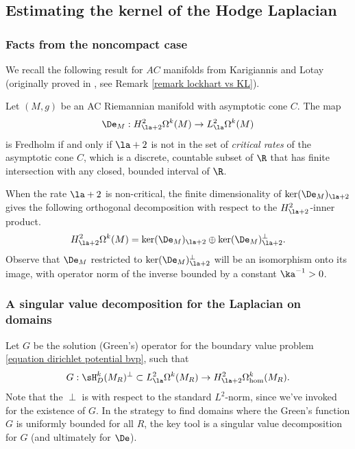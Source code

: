 \documentclass[hidelinks, 12pt, oneside, reqno]{amsart}
\begin{document}
\subsection{Estimating the kernel of the Hodge Laplacian}

\subsubsection{Facts from the noncompact case}

We recall the following result for $AC$ manifolds from Karigiannis and Lotay (originally proved in \cite{Lockhart1987}, see Remark \ref{remark lockhart vs KL}). 

\begin{thm}\cite[Theorem 4.11]{KarigiannisLotay}\label{theorem fredholmness of laplacian} Let $(M,g)$ be an AC Riemannian manifold with asymptotic cone $C$. The map
\[
\De_M: H^{2}_{\la + 2}\Omega^k(M) \rightarrow L^{2}_{\la}\Omega^k(M)
\]
is Fredholm if and only if $\la +2$ is not in the set of \emph{critical rates} of the asymptotic cone $C$, which is a discrete, countable subset of $\R$ that has finite intersection with any closed, bounded interval of $\R$.
\end{thm}

When the rate $\la + 2$ is non-critical, the finite dimensionality of $\ker(\De_M)_{\la +2}$ gives the following orthogonal decomposition with respect to the $H^{2}_{\la + 2}$-inner product. 
\[
H^{2}_{\la + 2}\Omega^k(M) = \ker(\De_M)_{\la +2} \oplus \ker(\De_M)_{\la +2}^\perp.
\]
Observe that $\De_M$ restricted to $\ker(\De_M)_{\la +2}^\perp$ will be an isomorphism onto its image, with operator norm of the inverse bounded by a constant $\ka^{-1} > 0$.  

\subsubsection{A singular value decomposition for the Laplacian on domains} \label{section SVD}
 
Let $G$ be the solution (Green's) operator for the boundary value problem \eqref{equation dirichlet potential bvp}, such that 
\[
G: \sH^k_D(M_R)^\perp \subset L^2_{\la}\Omega^k(M_R) \rightarrow H^{2}_{\la +2} \Omega^k_{\mathrm{hom}} (M_R). 
\]
Note that the $\perp$ is with respect to the standard $L^2$-norm, since we've invoked \cite[Theorems 2.2.4-6]{HodgeDecompSchwarz} for the existence of $G$. In the strategy to find domains where the Green's function $G$ is uniformly bounded for all $R$, the key tool is a singular value decomposition for $G$ (and ultimately for $\De$).  
\end{document}

